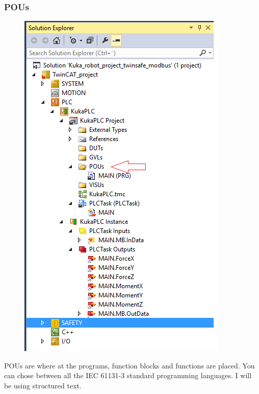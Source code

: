 \documentclass{article}
\begin{document}
\subsubsection{POUs}
\begin{figure}[!h]
    \centering
    \includegraphics[scale=0.7]{pictures/TC3_overview/TC3_POUs.png}
    \caption{}
   
\end{figure}

POUs are where at the programs, function blocks and functions are placed. You can chose between all the IEC 61131-3 standard programming languages. I will be using structured text. 

\newpage
\end{document}
